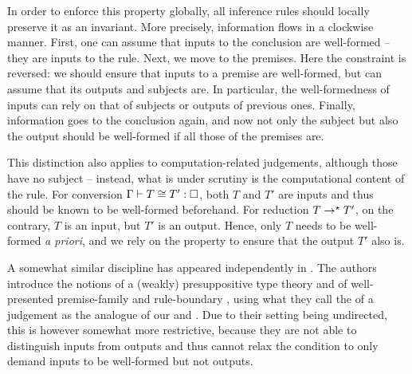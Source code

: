 In order to enforce this property globally, all inference rules should locally
preserve it as an invariant.%
More precisely, information flows in a clockwise manner. First, one can assume that inputs
to the conclusion are well-formed – they are inputs to the rule. Next, we move to the
premises. Here the constraint is reversed: we should ensure that inputs to a premise are
well-formed, but can assume that its outputs and subjects are. In particular,
the well-formedness of inputs can rely on that of subjects or outputs
of previous ones.
Finally, information goes to the conclusion again, and now not only the subject but also
the output should be well-formed if all those of the premises are.

This distinction also applies to computation-related judgements, although those have no subject – instead, what is under scrutiny is the computational content of the rule.
For conversion $\Gamma \vdash T \conv T' : \uni$, 
both $T$ and $T'$ are inputs and thus should be known to be well-formed beforehand.
For reduction $T \rightarrow^{\star} T'$, on the contrary, $T$ is an input,
but $T'$ is an output. Hence, only $T$ needs to be well-formed \textit{a priori},
and we rely on the  property to ensure
that the output $T'$ also is.

\AP A somewhat similar discipline has appeared independently in .
The authors introduce the notions of a (weakly) presuppositive type theory
\cite[Def.~5.6]{Bauer2020} and of well-presented premise-family and rule-boundary
\cite[Def.~6.16 and 6.17]{Bauer2020}, using what they call the  of a judgement
as the analogue of our  and .
Due to their setting being undirected, this is however somewhat more restrictive,
because they are not able to distinguish inputs from outputs and thus cannot relax the
condition to only demand inputs to be well-formed but not outputs.

